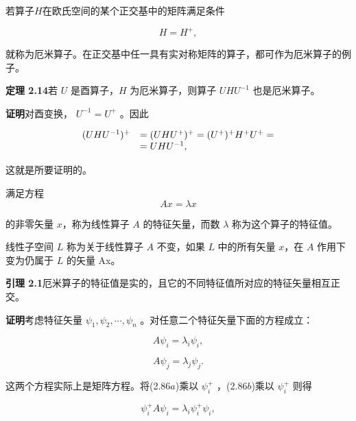 若算子$H$在欧氏空间的某个正交基中的矩阵满足条件

\begin{equation*}
H = H ^ {+},\tag{2.84}
\end{equation*}

就称为厄米算子。在正交基中任一具有实对称矩阵的算子，都可作为厄米算子的例子。

\textbf{定理 2.14}\quad 若 $U$ 是酉算子，$H$ 为厄米算子，则算子 $UHU^{-1}$ 也是厄米算子。

\textbf{证明}\quad 对酉变换， $U^{-1}=U^{+}$ 。因此

\begin{equation*}
\begin{array}{r l} (U H U ^ {- 1}) ^ {+} & = (U H U ^ {+}) ^ {+} = (U ^ {+}) ^ {+} H ^ {+} U ^ {+} = \\ & = U H U ^ {- 1}, \end{array}
\end{equation*}

这就是所要证明的。

满足方程
\begin{equation*}
A x = \lambda x\tag{2.85}
\end{equation*}

的非零矢量 $x$，称为线性算子 $A$ 的特征矢量，而数 $\lambda$ 称为这个算子的特征值。

线性子空间 $L$ 称为关于线性算子 $A$ 不变，如果 $L$ 中的所有矢量 $x$，在 $A$ 作用下变为仍属于 $L$ 的矢量 Ax。

\textbf{引理 2.1}\quad 厄米算子的特征值是实的，且它的不同特征值所对应的特征矢量相互正交。

\textbf{证明}\quad 考虑特征矢量 $\psi_{1}, \psi_{2}, \cdots, \psi_{n}$ 。对任意二个特征矢量下面的方程成立：

\begin{equation*}
A \psi_ {i} = \lambda_ {i} \psi_ {i},\tag{2.86a}
\end{equation*}

\begin{equation*}
A \psi_ {j} = \lambda_ {j} \psi_ {j}.\tag{2.86b}
\end{equation*}

这两个方程实际上是矩阵方程。将(2.86$a$)乘以 $\psi_{i}^{+}$ ，(2.86$b$)乘以 $\psi_{i}^{+}$ 则得

\begin{equation*}
\psi_ {i} ^ {+} A \psi_ {i} = \lambda_ {i} \psi_ {i} ^ {+} \psi_ {i},\tag{2.87a}
\end{equation*}

